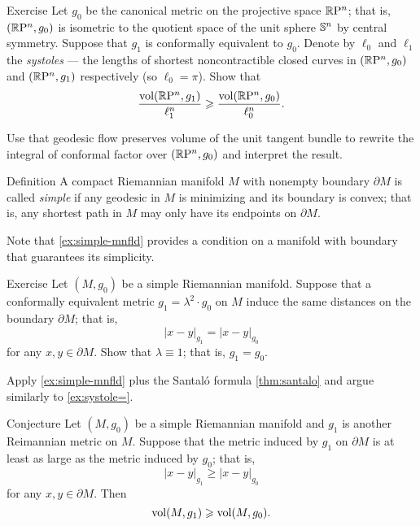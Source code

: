 \begin{thm}{Exercise}\label{ex:systole=}
Let $g_0$ be the canonical metric on the projective space $\mathbb{R}\mathrm{P}^n$; 
that is, $(\mathbb{R}\mathrm{P}^n,g_0)$ is isometric to the quotient space of the unit sphere $\mathbb{S}^n$ by central symmetry.
Suppose that $g_1$ is conformally equivalent to $g_0$.
Denote by $\ell_0$ and $\ell_1$ the \emph{systoles} --- the lengths of shortest noncontractible closed curves in $(\mathbb{R}\mathrm{P}^n,g_0)$ and $(\mathbb{R}\mathrm{P}^n,g_1)$ respectively (so $\ell_0=\pi$).
Show that 
\[\frac{\operatorname{\rm vol}\nolimits(\mathbb{R}\mathrm{P}^n,g_1)}{\ell_1^n}\geqslant \frac{\operatorname{\rm vol}\nolimits(\mathbb{R}\mathrm{P}^n,g_0)}{\ell_0^n}.\]
\end{thm}

 Use that geodesic flow preserves volume of the unit tangent bundle to rewrite the integral of conformal factor over $(\mathbb{R}\mathrm{P}^n,g_0)$ and interpret the result.

\begin{thm}{Definition}
A compact Riemannian manifold $M$ with nonempty boundary $\partial M$ is called \emph{simple} if any geodesic in $M$ is minimizing and
its boundary is convex;
that is, any shortest path in $M$ may only have its endpoints on $\partial M$.

\end{thm}

Note that \ref{ex:simple-mnfld} provides a condition on a manifold with boundary that guarantees its simplicity.

\begin{thm}{Exercise}\label{ex:conformal}
Let $(M,g_0)$ be a simple Riemannian manifold.
Suppose that a conformally equivalent metric $g_1=\lambda^2\cdot g_0$ on $M$ induce the same distances on the boundary $\partial M$;
that is,
\[|x-y|_{g_1}=|x-y|_{g_0}\]
for any $x,y\in\partial M$.
Show that $\lambda\equiv 1$; that is, $g_1=g_0$.
\end{thm}

Apply \ref{ex:simple-mnfld} plus the Santal\'{o} formula \ref{thm:santalo} and argue similarly to \ref{ex:systole=}.

\begin{thm}{Conjecture}
Let $(M,g_0)$ be a simple Riemannian manifold and $g_1$ is another Reimannian metric on $M$.
Suppose that the metric induced by $g_1$ on $\partial M$ is at least as large as the metric induced by $g_0$;
that is,
\[|x-y|_{g_1}\ge|x-y|_{g_0}\]
for any $x,y\in\partial M$.
Then 
\[\operatorname{\rm vol}\nolimits (M,g_1)\geqslant \operatorname{\rm vol}\nolimits (M,g_0).\]

\end{thm}


